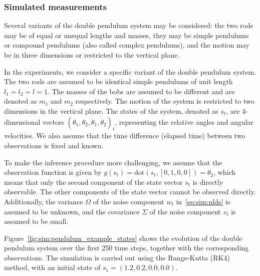 \subsubsection{Simulated measurements}

Several variants of the double pendulum system may be considered: the two rods may be of equal
or unequal lengths and masses, they may be simple pendulums or compound pendulums (also called
complex pendulums), and the motion may be in three dimensions or restricted to the vertical
plane.

In the experiments, we consider a specific variant of the double pendulum system.
The two rods are assumed to be identical simple pendulums of unit length $l_1 = l_2 = l = 1$.
The masses of the bobs are assumed to be different and are denoted as $m_1$ and $m_2$
respectively.
The motion of the system is restricted to two dimensions in the vertical plane.
The states of the system, denoted as $s_t$, are 4-dimensional vectors $(\theta_1, \theta_2,
  \dot{\theta}_1, \dot{\theta}_2)_t$, representing the relative angles and angular velocities.
We also assume that the time difference (elapsed time) between two observations is fixed and known.

To make the inference procedure more challenging, we assume that the observation function is
given by $g(s_t) = \mathrm{dot}(s_t, \left[ 0, 1, 0, 0 \right]) = \theta_2$, which means that only the second component of the state vector $s_t$ is directly observable.
The other components of the state vector cannot be observed directly.
Additionally, the variance $\Omega$ of the noise component $w_t$ in~\eqref{eq:sim:nlds}
is assumed to be unknown, and the covariance $\Sigma$ of the noise component $v_t$ is assumed to be
small.

Figure~\ref{fig:sim:pendulum_example_states} shows the evolution of the double pendulum system
over the first 250 time steps, together with the corresponding observations.
The simulation is carried out using the Runge-Kutta (RK4) method, with an initial state of $s_1
  = (1.2, 0.2, 0.0, 0.0)$.

